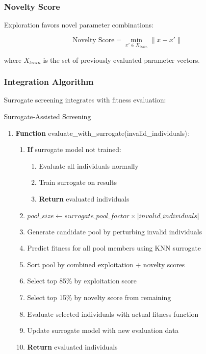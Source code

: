 \documentclass[12pt,a4paper]{article}
\begin{document}
\subsubsection{Novelty Score}

Exploration favors novel parameter combinations:

\begin{equation}\label{Eq.novelty_score}
\text{Novelty Score} = \min_{x' \in X_{train}} \|x - x'\|
\end{equation}

where $X_{train}$ is the set of previously evaluated parameter vectors.

\subsubsection{Integration Algorithm}

Surrogate screening integrates with fitness evaluation:

\begin{algorithm}
\caption{Surrogate-Assisted Screening}
\begin{enumerate}
    \item \textbf{Function} evaluate\_with\_surrogate(invalid\_individuals):
    \begin{enumerate}
        \item \textbf{If} surrogate model not trained:
        \begin{enumerate}
            \item Evaluate all individuals normally
            \item Train surrogate on results
            \item \textbf{Return} evaluated individuals
        \end{enumerate}
        \item $pool\_size \leftarrow surrogate\_pool\_factor \times |invalid\_individuals|$
        \item Generate candidate pool by perturbing invalid individuals
        \item Predict fitness for all pool members using KNN surrogate
        \item Sort pool by combined exploitation + novelty scores
        \item Select top 85\% by exploitation score
        \item Select top 15\% by novelty score from remaining
        \item Evaluate selected individuals with actual fitness function
        \item Update surrogate model with new evaluation data
        \item \textbf{Return} evaluated individuals
    \end{enumerate}
\end{enumerate}
\end{algorithm}
\end{document}
